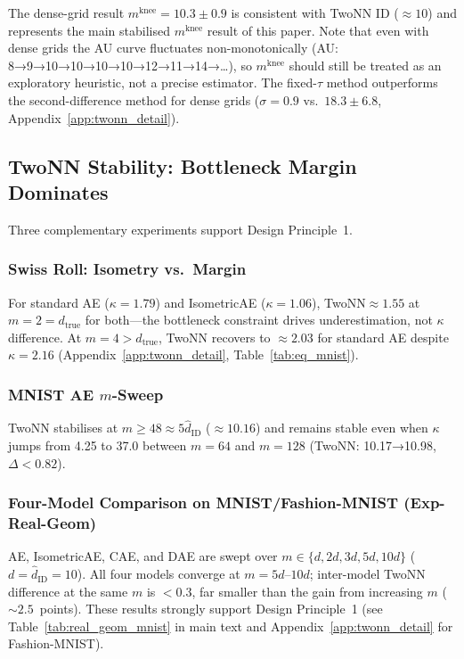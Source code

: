 \documentclass[11pt,a4paper]{article}
\newcommand{\kap}{\kappa}
\newcommand{\mknee}{m^{\mathrm{knee}}}
\newcommand{\hatdID}{\hat{d}_{\mathrm{ID}}}
\begin{document}
The dense-grid result $\mknee=10.3\pm0.9$ is consistent with TwoNN ID
($\approx10$) and represents the main stabilised $\mknee$ result of this paper.
Note that even with dense grids the AU curve fluctuates non-monotonically
(AU: 8→9→10→10→10→10→12→11→14→\ldots), so $\mknee$ should still be
treated as an exploratory heuristic, not a precise estimator.
The fixed-$\tau$ method outperforms the second-difference method for dense grids
($\sigma=0.9$ vs.\ $18.3\pm6.8$, Appendix~\ref{app:twonn_detail}).

\subsection{TwoNN Stability: Bottleneck Margin Dominates}\label{sec:exp_stability}

Three complementary experiments support Design Principle~1.

\subsubsection{Swiss Roll: Isometry vs.\ Margin}

For standard AE ($\kap=1.79$) and IsometricAE ($\kap=1.06$), TwoNN$\approx1.55$
at $m=2=d_{\mathrm{true}}$ for both—the bottleneck constraint drives
underestimation, not $\kap$ difference.
At $m=4>d_{\mathrm{true}}$, TwoNN recovers to $\approx2.03$ for standard AE
despite $\kap=2.16$ (Appendix~\ref{app:twonn_detail}, Table~\ref{tab:eq_mnist}).

\subsubsection{MNIST AE $m$-Sweep}

TwoNN stabilises at $m\geq48\approx5\hatdID$ ($\approx10.16$) and remains
stable even when $\kap$ jumps from 4.25 to 37.0 between $m=64$ and $m=128$
(TwoNN: 10.17→10.98, $\Delta<0.82$).

\subsubsection{Four-Model Comparison on MNIST/Fashion-MNIST (Exp-Real-Geom)}

AE, IsometricAE, CAE, and DAE are swept over $m\in\{d,2d,3d,5d,10d\}$
($d=\hatdID=10$).  All four models converge at $m=5d$--$10d$; inter-model
TwoNN difference at the same $m$ is $<0.3$, far smaller than the gain from
increasing $m$ ($\sim2.5$~points).  These results strongly support
Design Principle~1 (see Table~\ref{tab:real_geom_mnist} in main text
and Appendix~\ref{app:twonn_detail} for Fashion-MNIST).
\end{document}

